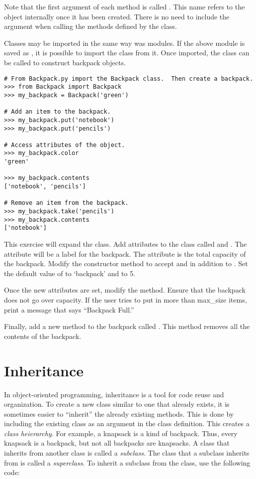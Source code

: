 Note that the first argument of each method is called .
This name refers to the object internally once it has been created.
There is no need to include the  argument when calling the methods defined by the class.

Classes may be imported in the same way was modules.
If the above module is saved as , it is possible to import the  class from it.
Once imported, the  class can be called to construct backpack objects.
\begin{lstlisting}
# From Backpack.py import the Backpack class.  Then create a backpack.
>>> from Backpack import Backpack
>>> my_backpack = Backpack('green')

# Add an item to the backpack.
>>> my_backpack.put('notebook')
>>> my_backpack.put('pencils')

# Access attributes of the object.
>>> my_backpack.color
'green'

>>> my_backpack.contents
['notebook', 'pencils']

# Remove an item from the backpack.
>>> my_backpack.take('pencils')
>>> my_backpack.contents
['notebook']
\end{lstlisting}

\begin{problem}
This exercise will expand the  class.
Add attributes to the class called  and .
The  attribute will be a label for the backpack.
The  attribute is the total capacity of the backpack.
Modify the constructor method to accept  and  in addition to .
Set the default value of  to `backpack' and  to 5.

Once the new attributes are set, modify the  method.
Ensure that the backpack does not go over capacity.
If the user tries to put in more than max\_size items, print a message that says ``Backpack Full.''

Finally, add a new method to the backpack called .
This method removes all the contents of the backpack.
\end{problem}

\section*{Inheritance}

In object-oriented programming, inheritance is a tool for code reuse and organization.
To create a new class similar to one that already exists, it is sometimes easier to ``inherit'' the already existing methods.
This is done by including the existing class as an argument in the class definition.
This creates a \emph{class heierarchy}.
For example, a knapsack is a kind of backpack.
Thus, every knapsack is a backpack, but not all backpacks are knapsacks.
A class that inherits from another class is called a \emph{subclass}.
The class that a subclass inherits from is called a \emph{superclass}.
To inherit a  subclass from the  class, use the following code:


